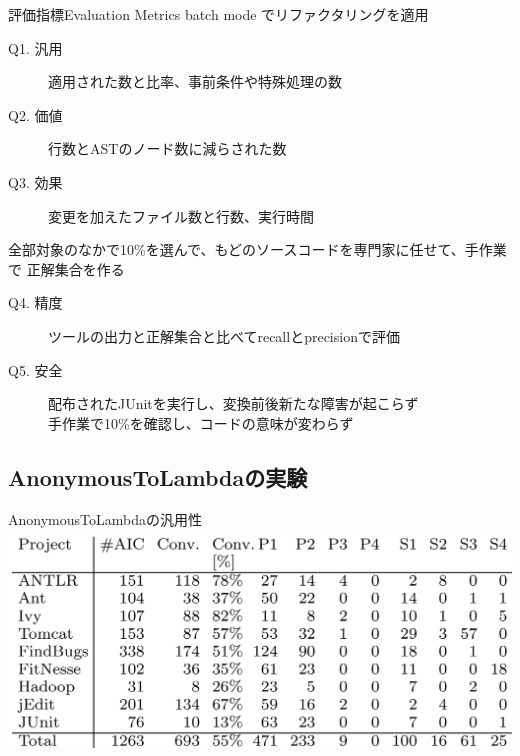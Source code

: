 \begin{frame}{評価指標}{Evaluation Metrics}
batch mode でリファクタリングを適用
\begin{description}
  \item[Q1. 汎用] 適用された数と比率、事前条件や特殊処理の数
  \item[Q2. 価値] 行数とASTのノード数に減らされた数
  \item[Q3. 効果] 変更を加えたファイル数と行数、実行時間
\end{description}
全部対象のなかで10\%を選んで、もどのソースコードを専門家に任せて、手作業で
正解集合を作る
\begin{description}
  \item[Q4. 精度] ツールの出力と正解集合と比べてrecallとprecisionで評価
  \item[Q5. 安全] 配布されたJUnitを実行し、変換前後新たな障害が起こらず\\
                  手作業で10\%を確認し、コードの意味が変わらず
\end{description}
\end{frame}
\subsection{AnonymousToLambdaの実験}
\begin{frame}{AnonymousToLambdaの汎用性}
\includegraphics[width=\textwidth,height=.8\textheight,keepaspectratio]{aicapp}
\end{frame}

